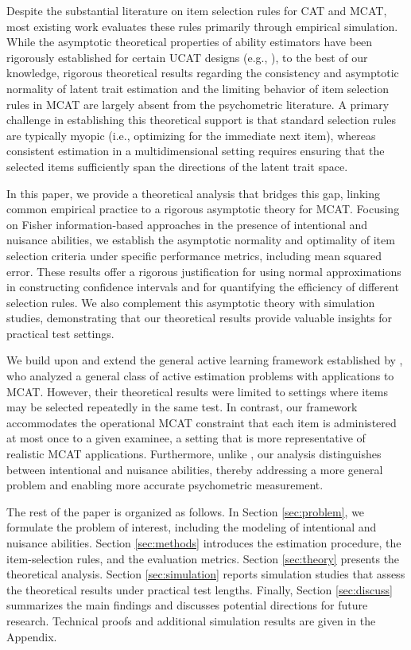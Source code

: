 \documentclass[12pt]{article}
\begin{document}
Despite the substantial literature on item selection rules for CAT and MCAT, most existing work evaluates these rules primarily through empirical simulation. While the asymptotic theoretical properties of ability estimators have been rigorously established for certain UCAT designs (e.g., ), to the best of our knowledge, rigorous theoretical results regarding the consistency and asymptotic normality of latent trait estimation and the limiting behavior of item selection rules in MCAT are largely absent from the psychometric literature. A primary challenge in establishing this theoretical support is that standard selection rules are typically myopic (i.e., optimizing for the immediate next item), whereas consistent estimation in a multidimensional setting requires ensuring that the selected items sufficiently span the directions of the latent trait space.

In this paper, we provide a theoretical analysis that bridges this gap, linking common empirical practice to a rigorous asymptotic theory for MCAT. Focusing on Fisher information-based approaches in the presence of intentional and nuisance abilities, we establish the asymptotic normality and optimality of item selection criteria under specific performance metrics, including mean squared error. These results offer a rigorous justification for using normal approximations in constructing confidence intervals and for quantifying the efficiency of different selection rules. We also complement this asymptotic theory with simulation studies, demonstrating that our theoretical results provide valuable insights for practical test settings.

We build upon and extend the general active learning framework established by , who analyzed a general class of active estimation problems with applications to MCAT. However, their theoretical results were limited to settings where items may be selected repeatedly in the same test. In contrast, our framework accommodates the operational MCAT constraint that each item is administered at most once to a given examinee, a setting that is more representative of realistic MCAT applications. Furthermore, unlike , our analysis distinguishes between intentional and nuisance abilities, thereby addressing a more general problem and enabling more accurate psychometric measurement.

The rest of the paper is organized as follows. In Section \ref{sec:problem}, we formulate the problem of interest, including the modeling of intentional and nuisance abilities. Section \ref{sec:methods} introduces the estimation procedure, the item-selection rules, and the evaluation metrics. Section \ref{sec:theory} presents the theoretical analysis. Section \ref{sec:simulation} reports simulation studies that assess the theoretical results under practical test lengths. Finally, Section \ref{sec:discuss} summarizes the main findings and discusses potential directions for future research. Technical proofs and additional simulation results are given in the Appendix.
\end{document}
